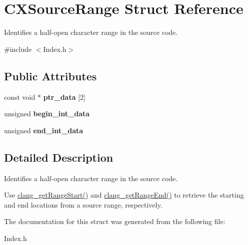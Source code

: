 \hypertarget{structCXSourceRange}{}\section{C\+X\+Source\+Range Struct Reference}
\label{structCXSourceRange}


Identifies a half-\/open character range in the source code.  




{\ttfamily \#include $<$Index.\+h$>$}

\subsection*{Public Attributes}
\begin{DoxyCompactItemize}
\item 
\mbox{\label{structCXSourceRange_a370a86ac6ac3ecf5c668b7e4f0a1366e}} 
const void $\ast$ {\bfseries ptr\+\_\+data} \mbox{[}2\mbox{]}
\item 
\mbox{\label{structCXSourceRange_a9ea78e31b552c79a8823690275c86165}} 
unsigned {\bfseries begin\+\_\+int\+\_\+data}
\item 
\mbox{\label{structCXSourceRange_ab223a601843114cb35a96dbcf1877093}} 
unsigned {\bfseries end\+\_\+int\+\_\+data}
\end{DoxyCompactItemize}


\subsection{Detailed Description}
Identifies a half-\/open character range in the source code. 

Use \mbox{\hyperlink{group__CINDEX__LOCATIONS_gac2cc034e3965739c41662f6ada7ff248}{clang\+\_\+get\+Range\+Start()}} and \mbox{\hyperlink{group__CINDEX__LOCATIONS_gacdb7d3c2b77a06bcc2e83bde3e14c3c0}{clang\+\_\+get\+Range\+End()}} to retrieve the starting and end locations from a source range, respectively. 

The documentation for this struct was generated from the following file\+:\begin{DoxyCompactItemize}
\item 
Index.\+h\end{DoxyCompactItemize}

